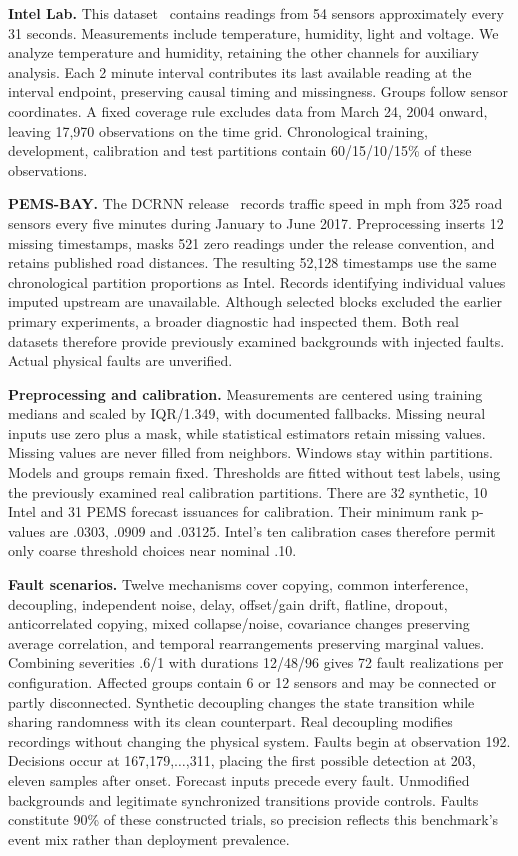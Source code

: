 \documentclass[conference]{IEEEtran}
\begin{document}
\textbf{Intel Lab.} This dataset~\cite{intel} contains readings from 54 sensors
approximately every 31 seconds. Measurements include temperature, humidity,
light and voltage. We analyze temperature and humidity, retaining the other
channels for auxiliary analysis. Each 2 minute interval contributes its
last available reading at the interval endpoint, preserving causal timing
and missingness. Groups follow sensor coordinates. A fixed coverage rule
excludes data from March 24, 2004 onward, leaving 17,970 observations on the
time grid. Chronological training, development, calibration and test
partitions contain 60/15/10/15\% of these observations.

\textbf{PEMS-BAY.} The DCRNN release~\cite{dcrnn} records traffic speed in mph
from 325 road sensors every five minutes during January to June 2017.
Preprocessing inserts 12 missing timestamps, masks 521 zero readings under
the release convention, and retains published road distances. The resulting
52,128 timestamps use the same chronological partition proportions as Intel.
Records identifying individual values imputed upstream are unavailable.
Although selected blocks excluded the earlier primary experiments, a broader
diagnostic had inspected them. Both real datasets therefore provide previously
examined backgrounds with injected faults. Actual physical faults are unverified.

\textbf{Preprocessing and calibration.} Measurements are centered using
training medians and scaled by IQR/1.349, with documented fallbacks.
Missing neural inputs use zero plus a mask, while statistical estimators
retain missing values. Missing values are never filled from neighbors.
Windows stay within partitions. Models and groups remain fixed.
Thresholds are fitted without test labels, using the previously examined real
calibration partitions. There are 32 synthetic, 10 Intel and 31 PEMS forecast
issuances for calibration. Their minimum rank p-values are .0303, .0909 and
.03125. Intel's ten calibration cases therefore permit only coarse threshold
choices near nominal .10.

\textbf{Fault scenarios.} Twelve mechanisms cover copying, common interference,
decoupling, independent noise, delay, offset/gain drift, flatline, dropout,
anticorrelated copying, mixed collapse/noise, covariance changes preserving
average correlation, and temporal rearrangements preserving marginal values.
Combining severities .6/1 with durations 12/48/96 gives 72 fault realizations
per configuration. Affected groups contain 6 or 12 sensors and may be connected
or partly disconnected. Synthetic decoupling changes the state transition
while sharing randomness with its clean counterpart. Real decoupling modifies
recordings without changing the physical system. Faults begin at observation
192. Decisions occur at 167,179,$\ldots$,311, placing the first possible
detection at 203, eleven samples after onset. Forecast inputs precede every
fault. Unmodified backgrounds and legitimate synchronized transitions provide
controls. Faults constitute 90\% of these constructed trials, so precision
reflects this benchmark's event mix rather than deployment prevalence.
\end{document}
